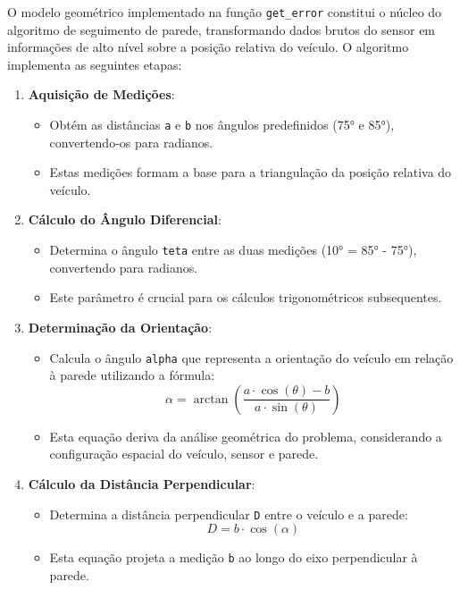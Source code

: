 O modelo geométrico implementado na função \texttt{get\_error} constitui o
núcleo do algoritmo de seguimento de parede, transformando dados brutos do
sensor em informações de alto nível sobre a posição relativa do veículo. O
algoritmo implementa as seguintes etapas:

\begin{enumerate}
    \item \textbf{Aquisição de Medições}:
          \begin{itemize}
              \item Obtém as distâncias \texttt{a} e \texttt{b} nos ângulos predefinidos (75° e
                    85°), convertendo-os para radianos.
              \item Estas medições formam a base para a triangulação da posição relativa do
                    veículo.
          \end{itemize}

    \item \textbf{Cálculo do Ângulo Diferencial}:
          \begin{itemize}
              \item Determina o ângulo \texttt{teta} entre as duas medições (10° = 85° - 75°),
                    convertendo para radianos.
              \item Este parâmetro é crucial para os cálculos trigonométricos subsequentes.
          \end{itemize}

    \item \textbf{Determinação da Orientação}:
          \begin{itemize}
              \item Calcula o ângulo \texttt{alpha} que representa a orientação do veículo em
                    relação à parede utilizando a fórmula:
                    \begin{equation}
                        \alpha = \arctan\left(\frac{a \cdot \cos(\theta) - b}{a \cdot \sin(\theta)}\right)
                    \end{equation}
              \item Esta equação deriva da análise geométrica do problema, considerando a
                    configuração espacial do veículo, sensor e parede.
          \end{itemize}

    \item \textbf{Cálculo da Distância Perpendicular}:
          \begin{itemize}
              \item Determina a distância perpendicular \texttt{D} entre o veículo e a parede:
                    \begin{equation}
                        D = b \cdot \cos(\alpha)
                    \end{equation}
              \item Esta equação projeta a medição \texttt{b} ao longo do eixo perpendicular à
                    parede.
          \end{itemize}


\end{enumerate}
